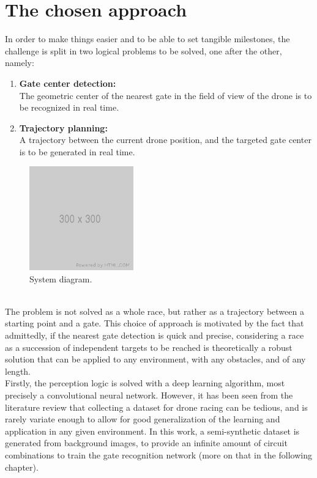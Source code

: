 \section{The chosen approach}


In order to make things easier and to be able to set tangible milestones, the
challenge is split in two logical problems to be solved, one after the
other, namely:
\begin{enumerate}
	\item{\textbf{Gate center detection:\\}
			The geometric center of the nearest gate in the field of view of the
			drone is to be recognized in real time.
	}
	\item{\textbf{Trajectory planning:\\}
			A trajectory between the current drone position, and the targeted gate
			center is to be generated in real time.
	}
\end{enumerate}

\begin{figure}[h!]
	\centering
	\includegraphics[width=0.4\textwidth]{figure/300x300.png}
	\caption{System diagram.}
	\label{fig:system}
\end{figure}

~\\The problem is not solved as a whole race, but rather as a trajectory
between a starting point and a gate. This choice of approach is motivated by
the fact that admittedly, if the nearest gate detection is quick and precise,
considering a race as a succession of independent targets to be reached is
theoretically a robust solution that can be applied to any environment, with any
obstacles, and of any length.\\

Firstly, the perception logic is solved with a deep learning algorithm, most
precisely a convolutional neural network. However, it has been seen from
the literature review that collecting a dataset for drone racing can be
tedious, and is rarely variate enough to allow for good generalization of the
learning and application in any given environment. In this work, a
semi-synthetic dataset is generated from background images, to provide an
infinite amount of circuit combinations to train the gate recognition network
(more on that in the following chapter).

